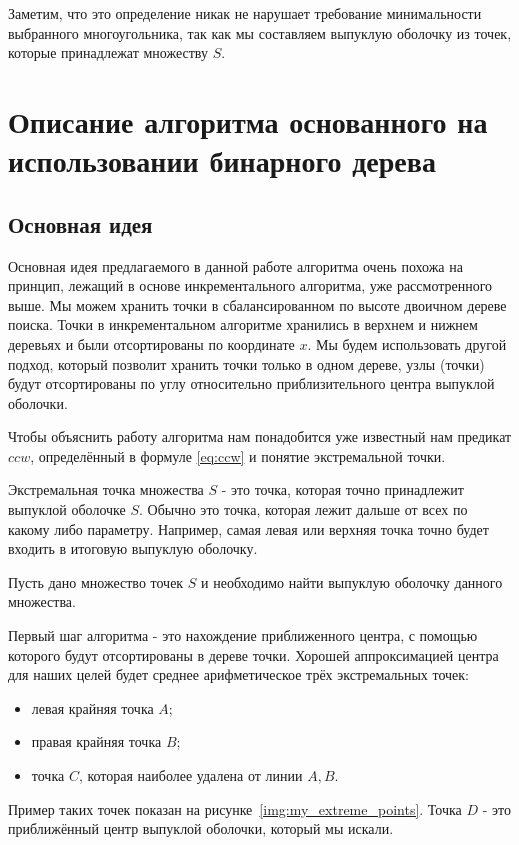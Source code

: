Заметим, что это определение никак не нарушает требование минимальности выбранного многоугольника, так как мы составляем выпуклую оболочку из точек, которые принадлежат множеству $S$.

\section{Описание алгоритма основанного на использовании бинарного дерева} \label{sect2_2}

\subsection{Основная идея} \label{subsect2_2_1}

Основная идея предлагаемого в данной работе алгоритма очень похожа на принцип, лежащий в основе инкрементального алгоритма, уже рассмотренного выше. Мы можем хранить точки в сбалансированном по высоте двоичном дереве поиска. Точки в инкрементальном алгоритме хранились в верхнем и нижнем деревьях и были отсортированы по координате $x$. Мы будем использовать другой подход, который позволит хранить точки только в одном дереве, узлы (точки) будут отсортированы по углу относительно приблизительного центра выпуклой оболочки.

Чтобы объяснить работу алгоритма нам понадобится уже известный нам предикат $ccw$, определённый в формуле \ref{eq:ccw} и понятие экстремальной точки.

Экстремальная точка множества $S$ - это точка, которая точно принадлежит выпуклой оболочке $S$. Обычно это точка, которая лежит дальше от всех по какому либо параметру. Например, самая левая или верхняя точка точно будет входить в итоговую выпуклую оболочку.

Пусть дано множество точек $S$ и необходимо найти выпуклую оболочку данного множества.

Первый шаг алгоритма - это нахождение приближенного центра, с помощью которого будут отсортированы в дереве точки. Хорошей аппроксимацией центра для наших целей будет среднее арифметическое трёх экстремальных точек:
\begin{itemize}
	\item левая крайняя точка $A$;
	\item правая крайняя точка $B$;
	\item точка $C$, которая наиболее удалена от линии $A,B$.
\end{itemize}

Пример таких точек показан на рисунке~\ref{img:my_extreme_points}. Точка $D$ - это приближённый центр выпуклой оболочки, который мы искали.

